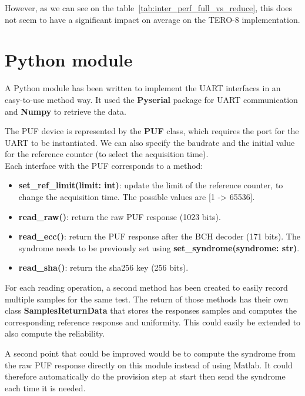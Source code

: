 However, as we can see on the table~\ref{tab:inter_perf_full_vs_reduce}, this does not seem to have a significant impact on average on the TERO-8 implementation.

\newpage
\section{Python module}
\label{appendix:python_mod}

A Python module has been written to implement the UART interfaces in an easy-to-use method way. It used the \textbf{Pyserial} package for UART communication and \textbf{Numpy} to retrieve the data.

The PUF device is represented by the \textbf{PUF} class, which requires the port for the UART to be instantiated. We can also specify the baudrate and the initial value for the reference counter (to select the acquisition time).\\

Each interface with the PUF corresponds to a method:

\begin{itemize}
    \item \textbf{set\_ref\_limit(limit: int)}: update the limit of the reference counter, to change the acquisition time. The possible values are [1 -> 65536].
    \item \textbf{read\_raw()}: return the raw PUF response (1023 bits).
    \item \textbf{read\_ecc()}: return the PUF response after the BCH decoder (171 bits). The syndrome needs to be previously set using \textbf{set\_syndrome(syndrome: str)}.
    \item \textbf{read\_sha()}: return the sha256 key (256 bits).
\end{itemize}


For each reading operation, a second method has been created to easily record multiple samples for the same test. The return of those methods has their own class \textbf{SamplesReturnData} that stores the responses samples and computes the corresponding reference response and uniformity. This could easily be extended to also compute the reliability.

A second point that could be improved would be to compute the syndrome from the raw PUF response directly on this module instead of using Matlab. It could therefore automatically do the provision step at start then send the syndrome each time it is needed.



